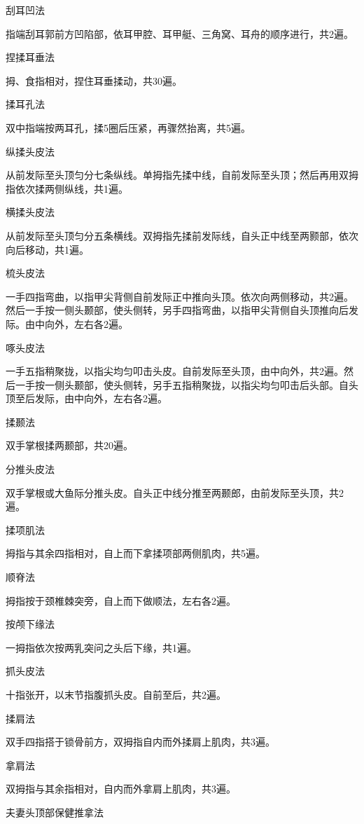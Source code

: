 \documentclass[12pt,UTF8]{ctexbook}
\begin{document}
刮耳凹法

指端刮耳郭前方凹陷部，依耳甲腔、耳甲艇、三角窝、耳舟的顺序进行，共2遍。

捏揉耳垂法

拇、食指相对，捏住耳垂揉动，共30遍。

揉耳孔法

双中指端按两耳孔，揉5圈后压紧，再骤然抬离，共5遍。

纵揉头皮法

从前发际至头顶匀分七条纵线。单拇指先揉中线，自前发际至头顶；然后再用双拇指依次揉两侧纵线，共1遍。

横揉头皮法

从前发际至头顶匀分五条横线。双拇指先揉前发际线，自头正中线至两颢部，依次向后移动，共1遍。

梳头皮法

一手四指弯曲，以指甲尖背侧自前发际正中推向头顶。依次向两侧移动，共2遍。然后一手按一侧头颞部，使头侧转，另手四指弯曲，以指甲尖背侧自头顶推向后发际。由中向外，左右各2遍。

啄头皮法

一手五指稍聚拢，以指尖均匀叩击头皮。自前发际至头顶，由中向外，共2遍。然后一手按一侧头颞部，使头侧转，另手五指稍聚拢，以指尖均匀叩击后头部。自头顶至后发际，由中向外，左右各2遍。

揉颞法

双手掌根揉两颞部，共20遍。

分推头皮法

双手掌根或大鱼际分推头皮。自头正中线分推至两颞郎，由前发际至头顶，共2遍。

揉项肌法

拇指与其余四指相对，自上而下拿揉项部两侧肌肉，共5遍。

顺脊法

拇指按于颈椎棘突旁，自上而下做顺法，左右各2遍。

按颅下缘法

一拇指依次按两乳突问之头后下缘，共1遍。

抓头皮法

十指张开，以末节指腹抓头皮。自前至后，共2遍。

揉肩法

双手四指搭于锁骨前方，双拇指自内而外揉肩上肌肉，共3遍。

拿肩法

双拇指与其余指相对，自内而外拿肩上肌肉，共3遍。





夫妻头顶部保健推拿法
\end{document}
